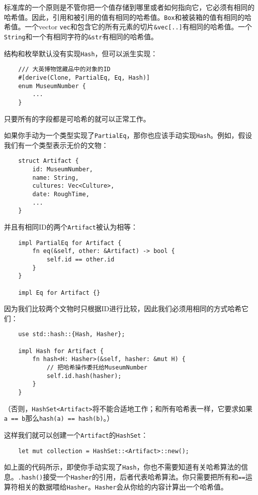 标准库的一个原则是不管你把一个值存储到哪里或者如何指向它，它必须有相同的哈希值。因此，引用和被引用的值有相同的哈希值。\texttt{Box}和被装箱的值有相同的哈希值。一个vector \texttt{vec}和包含它的所有元素的切片\texttt{\&vec[..]}有相同的哈希值。一个\texttt{String}和一个有相同字符的\texttt{\&str}有相同的哈希值。

结构和枚举默认没有实现\texttt{Hash}，但可以派生实现：
\begin{verbatim}
    /// 大英博物馆藏品中的对象的ID
    #[derive(Clone, PartialEq, Eq, Hash)]
    enum MuseumNumber {
        ...
    }
\end{verbatim}
只要所有的字段都是可哈希的就可以正常工作。

如果你手动为一个类型实现了\texttt{PartialEq}，那你也应该手动实现\texttt{Hash}。例如，假设我们有一个类型表示无价的文物：
\begin{verbatim}
    struct Artifact {
        id: MuseumNumber,
        name: String,
        cultures: Vec<Culture>,
        date: RoughTime,
        ...
    }
\end{verbatim}

并且有相同ID的两个\texttt{Artifact}被认为相等：
\begin{verbatim}
    impl PartialEq for Artifact {
        fn eq(&self, other: &Artifact) -> bool {
            self.id == other.id
        }
    }

    impl Eq for Artifact {}
\end{verbatim}

因为我们比较两个文物时只根据ID进行比较，因此我们必须用相同的方式哈希它们：
\begin{verbatim}
    use std::hash::{Hash, Hasher};

    impl Hash for Artifact {
        fn hash<H: Hasher>(&self, hasher: &mut H) {
            // 把哈希操作委托给MuseumNumber
            self.id.hash(hasher);
        }
    }
\end{verbatim}
（否则，\texttt{HashSet<Artifact>}将不能合适地工作；和所有哈希表一样，它要求如果\texttt{a == b}那么\texttt{hash(a) == hash(b)}。）

这样我们就可以创建一个\texttt{Artifact}的\texttt{HashSet}：
\begin{verbatim}
    let mut collection = HashSet::<Artifact>::new();
\end{verbatim}

如上面的代码所示，即使你手动实现了\texttt{Hash}，你也不需要知道有关哈希算法的信息。\texttt{.hash()}接受一个\texttt{Hasher}的引用，后者代表哈希算法。你只需要把所有和\texttt{==}运算符相关的数据喂给\texttt{Hasher}。\texttt{Hasher}会从你给的内容计算出一个哈希值。

